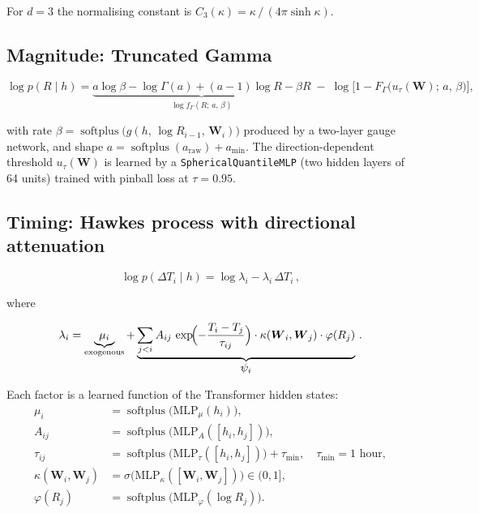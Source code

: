 \documentclass[11pt,a4paper]{article}
\newcommand{\bW}{\boldsymbol{W}}
\DeclareMathOperator{\softplus}{softplus}
\begin{document}
For $d = 3$ the normalising constant is
$C_3(\kappa) = \kappa \,/\, (4\pi\sinh\kappa)$.

\subsection{Magnitude: Truncated Gamma}

\begin{equation}\label{eq:mag}
  \log p(R \mid h)
  = \underbrace{a\log\beta - \log\Gamma(a) + (a-1)\log R - \beta R}_{\log f_{\Gamma}(R;\,a,\,\beta)}
  \;-\; \log\!\bigl[1 - F_\Gamma\!\bigl(u_\tau(\bW);\,a,\,\beta\bigr)\bigr],
\end{equation}

with rate $\beta = \softplus\!\bigl(g(h,\,\log R_{i-1},\,\bW_i)\bigr)$
produced by a two-layer gauge network, and shape
$a = \softplus(a_{\text{raw}}) + a_{\min}$.
The direction-dependent threshold $u_\tau(\bW)$ is learned by a
\texttt{SphericalQuantileMLP} (two hidden layers of 64 units)
trained with pinball loss at $\tau = 0.95$.

\subsection{Timing: Hawkes process with directional attenuation}

\begin{equation}\label{eq:time}
  \log p(\Delta T_i \mid h)
  = \log \lambda_i - \lambda_i \,\Delta T_i\,,
\end{equation}

where

\begin{equation}\label{eq:hawkes}
  \lambda_i
  = \underbrace{\mu_i}_{\text{exogenous}}
  + \underbrace{\sum_{j < i}
      A_{ij}\,
      \exp\!\Bigl(-\frac{T_i - T_j}{\tau_{ij}}\Bigr)
      \cdot \kappa(\bW_i, \bW_j)
      \cdot \varphi(R_j)}_{\displaystyle\psi_i}\,.
\end{equation}

Each factor is a learned function of the Transformer hidden states:
\begin{align}
  \mu_i &= \softplus\!\bigl(\text{MLP}_\mu(h_i)\bigr), \label{eq:mu_base} \\
  A_{ij} &= \softplus\!\bigl(\text{MLP}_A([h_i, h_j])\bigr), \label{eq:A} \\
  \tau_{ij} &= \softplus\!\bigl(\text{MLP}_\tau([h_i, h_j])\bigr) + \tau_{\min},
              \quad \tau_{\min} = 1\text{ hour}, \label{eq:tau} \\
  \kappa(\bW_i, \bW_j) &= \sigma\!\bigl(\text{MLP}_\kappa([\bW_i, \bW_j])\bigr) \in (0,1],
              \label{eq:attenuation} \\
  \varphi(R_j) &= \softplus\!\bigl(\text{MLP}_\varphi(\log R_j)\bigr). \label{eq:phi}
\end{align}
\end{document}
